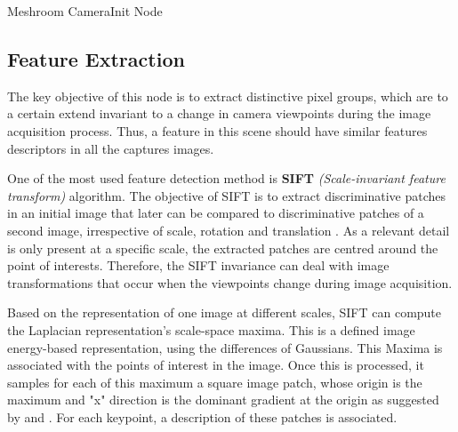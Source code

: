 \documentclass[12pt]{report}
\begin{document}
\begin{table}[H]
  \centering
  \caption{Meshroom CameraInit Node }
  \label{tab:CameraInit}
  \end{table}
  



\newpage
  \subsection{Feature Extraction}
  The key objective of this node is to extract distinctive pixel groups, which are to a certain extend invariant to a change in camera viewpoints during the image acquisition process.
  Thus, a feature in this scene should have similar features descriptors in all the captures images.
  
  One of the most used feature detection method is \textbf{SIFT} \textit{(Scale-invariant feature transform)} algorithm. 
  The objective of SIFT is to extract discriminative patches in an initial image that later can be compared to discriminative patches of a second image, irrespective of scale, rotation and translation .
  As a relevant detail is only present at a specific scale, the extracted patches are centred around the point of interests. 
  Therefore, the SIFT invariance can deal with image transformations that occur when the viewpoints change during image acquisition.
  
  Based on the representation of one image at different scales, SIFT can compute the  Laplacian representation's scale-space maxima. This is a defined image energy-based representation, using the differences of Gaussians.
  This Maxima is associated with the points of interest in the image. 
  Once this is processed, it samples for each of this maximum a square image patch, whose origin is the maximum and "x" direction is the dominant gradient at the origin as suggested by  and .
  For each keypoint, a description of these patches is associated. 
  
\end{document}
